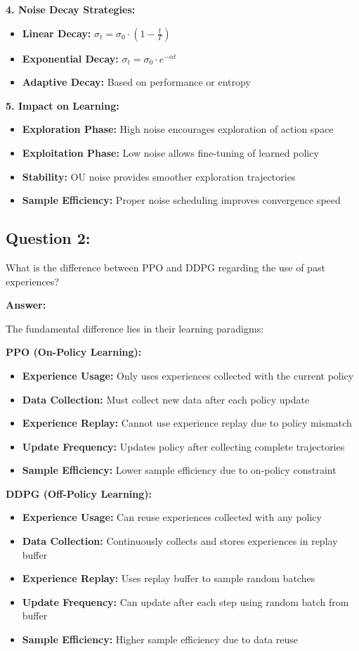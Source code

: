 \documentclass[12pt]{article}
\begin{document}
{{{\textbf{4. Noise Decay Strategies:}
\begin{itemize}
    \item \textbf{Linear Decay:} $\sigma_t = \sigma_0 \cdot (1 - \frac{t}{T})$
    \item \textbf{Exponential Decay:} $\sigma_t = \sigma_0 \cdot e^{-\alpha t}$
    \item \textbf{Adaptive Decay:} Based on performance or entropy
\end{itemize}

\textbf{5. Impact on Learning:}
\begin{itemize}
    \item \textbf{Exploration Phase:} High noise encourages exploration of action space
    \item \textbf{Exploitation Phase:} Low noise allows fine-tuning of learned policy
    \item \textbf{Stability:} OU noise provides smoother exploration trajectories
    \item \textbf{Sample Efficiency:} Proper noise scheduling improves convergence speed
\end{itemize}

\subsection{Question 2:}

What is the difference between PPO and DDPG regarding the use of past experiences?

\textbf{Answer:}

The fundamental difference lies in their learning paradigms:

\textbf{PPO (On-Policy Learning):}
\begin{itemize}
    \item \textbf{Experience Usage:} Only uses experiences collected with the current policy
    \item \textbf{Data Collection:} Must collect new data after each policy update
    \item \textbf{Experience Replay:} Cannot use experience replay due to policy mismatch
    \item \textbf{Update Frequency:} Updates policy after collecting complete trajectories
    \item \textbf{Sample Efficiency:} Lower sample efficiency due to on-policy constraint
\end{itemize}

\textbf{DDPG (Off-Policy Learning):}
\begin{itemize}
    \item \textbf{Experience Usage:} Can reuse experiences collected with any policy
    \item \textbf{Data Collection:} Continuously collects and stores experiences in replay buffer
    \item \textbf{Experience Replay:} Uses replay buffer to sample random batches
    \item \textbf{Update Frequency:} Can update after each step using random batch from buffer
    \item \textbf{Sample Efficiency:} Higher sample efficiency due to data reuse
\end{itemize}

}}}
\end{document}
